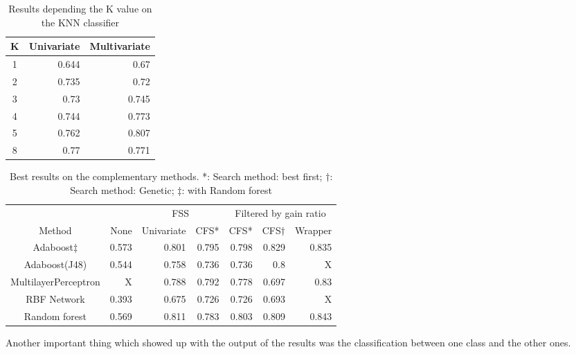 \documentclass[conference,a4paper]{IEEEtran}
\begin{document}
\begin{table}[h]
	\caption{Results depending the K value on the KNN classifier}
	\centering
	\begin{tabular}{c r r}
		\hline\hline
		K & Univariate & Multivariate\\ [0.2ex]
		\hline
		1 & 0.644 & 0.67\\
		2 & 0.735 & 0.72\\
		3 & 0.73 & 0.745\\
		4 & 0.744 & 0.773\\
		5 & 0.762 & 0.807\\
		8 & 0.77 & 0.771 \\ [1ex]
		\hline
	\end{tabular}
	\label{table:knnResults}
\end{table}

\begin{table}[h]
	\caption{Best results on the complementary methods. *: Search method: best first; $\dagger$: Search method: Genetic; $\ddagger$: with Random forest}
	\centering
	\begin{tabular}{c r r r r r r}
		\hline\hline
		& & \multicolumn{2}{c|}{FSS} & \multicolumn{3}{c}{Filtered by gain ratio}\\
		Method& None& Univariate& \multicolumn{1}{c|}{CFS*}& CFS*& CFS$\dagger$ & Wrapper\\ [0.2ex]
		\hline
		Adaboost$\ddagger$ & 0.573 & 0.801 & 0.795 & 0.798& 0.829 & 0.835 \\
		Adaboost(J48) & 0.544 & 0.758 & 0.736 & 0.736 & 0.8 & X \\
		MultilayerPerceptron & X & 0.788 & 0.792 & 0.778 & 0.697 & 0.83 \\
		RBF Network & 0.393 & 0.675 & 0.726 & 0.726 & 0.693 & X\\
		Random forest & 0.569 & 0.811 & 0.783 & 0.803 & 0.809 & 0.843 \\ [1ex]
		\hline
	\end{tabular}
	\label{table:complementaryResults}
\end{table}

Another important thing which showed up with the output of the results was the classification between one class and the other ones.
\end{document}
